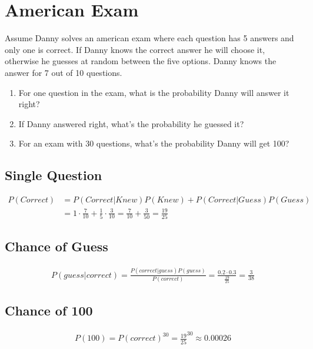 \clearpage
\section{American Exam}
\begin{colbox}
Assume Danny solves an american exam where each question has 5 answers and only one is correct. If Danny knows the correct answer he will choose it, otherwise he guesses at random between the five options. Danny knows the answer for 7 out of 10 questions.
\begin{enumerate}
	\item For one question in the exam, what is the probability Danny will answer it right?
	\item If Danny answered right, what's the probability he guessed it?
	\item For an exam with 30 questions, what's the probability Danny will get 100?
\end{enumerate}
\end{colbox}
\subsection{Single Question}
\begin{align}
	P(Correct) &= P(Correct | Knew)P(Knew) + P(Correct | Guess)P(Guess) \\
	&= 1 \cdot \frac{7}{10} + \frac{1}{5}\cdot\frac{3}{10} = \frac{7}{10} + \frac{3}{50} = \frac{19}{25}
\end{align}
\subsection{Chance of Guess}
\begin{align}
	P(guess | correct) = \frac{P(correct | guess)P(guess)}{P(correct)} = \frac{0.2 \cdot 0.3}{\frac{19}{25}} = \frac{3}{38}
\end{align}
\subsection{Chance of 100}
\begin{align}
	P(100) = {P(correct)}^{30} = {\frac{19}{25}}^{30} \approx 0.00026
\end{align}